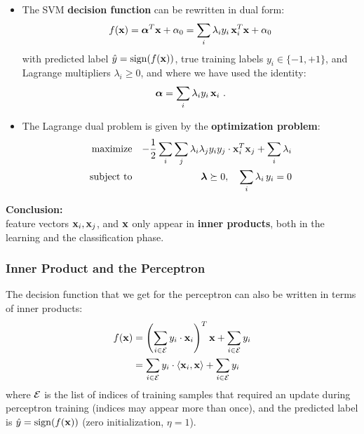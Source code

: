 	\begin{itemize}
		\item The SVM \textbf{decision function} can be rewritten in dual form:
		      {\small
		      \begin{displaymath}
			      f(\bm{\mathrm{x}}) =
			      \bm{\mathrm{\alpha}}^T\bm{\mathrm{x}} +\alpha_0 =
			      \sum_i \lambda_i y_i \, \bm{\mathrm{x}}_i^T \bm{\mathrm{x}} + \alpha_0
		      \end{displaymath}
		      }
		      with predicted label $\hat y = \operatorname{sign}(f(\bm{\mathrm{x}}))$, true training labels $y_i\in\{-1,+1\}$, and Lagrange multipliers $\lambda_i\ge 0$, and where we have used the identity:
		      {\small
		      \begin{displaymath}
			      \bm{\mathrm{\alpha}} = \sum_i \lambda_i y_i \, \bm{\mathrm{x}}_i~.
		      \end{displaymath}
		      }
		\item The Lagrange dual problem is given by the \textbf{optimization problem}:
		      {\small
		      \begin{eqnarray*}
			      \mbox{maximize}   & & -\frac{1}{2} \sum_i \sum_j \lambda_i \lambda_j y_i y_j \cdot \bm{\mathrm{x}}_i^T\bm{\mathrm{x}}_j + \sum_i \lambda_i \\
			      \mbox{subject to} & & \bm{\mathrm{\lambda}}\succeq 0, \quad \sum_{i} \lambda_i \, y_i = 0  
		      \end{eqnarray*}
		      }
	\end{itemize}

	\textbf {Conclusion:}\\
	feature vectors $\bm{\mathrm{x}}_i, \bm{\mathrm{x}}_j$, and $\bm{\mathrm{x}}$ only appear in   \textbf{inner products}, both in the learning and the classification phase.
     
	\subsubsection{Inner Product and the Perceptron}
	The decision function that we get for the perceptron can also be written in terms of inner products:
	\begin{align*}
		f(\bm{\mathrm{x}})
		&= \left (\sum_{i\in \cal E} y_i\cdot \bm{\mathrm{x}}_i \right)^T \bm{\mathrm{x}} + \sum_{i\in \cal E} y_i \\
		&= \sum_{i\in \cal E} y_i\cdot \langle \bm{\mathrm{x}}_i, \bm{\mathrm{x}}\rangle + \sum_{i\in \cal E} y_i
	\end{align*}
	where $\cal E$ is the list of indices of training samples that required an update during perceptron training (indices may appear more than once), and the predicted label is $\hat y = \operatorname{sign}(f(\bm{\mathrm{x}}))$ (zero initialization, $\eta=1$).

